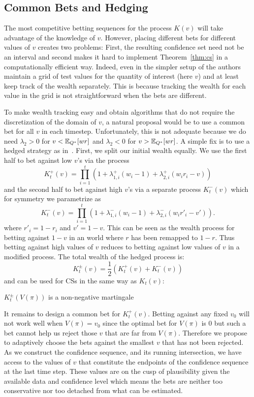 \subsection{Common Bets and Hedging}
\label{sec:hedged}
The most competitive betting sequences for the process $K(v)$ will take
advantage of the knowledge of $v$. However, placing different bets for
different values of $v$ creates two problems: First, the resulting confidence
set need not be an interval and second makes it hard to implement
Theorem~\ref{thm:cs} in a computationally efficient way.  Indeed, even in the
simpler setup of \cite{waudby-smith_variance-adaptive_2020} the authors
maintain a grid of test values for the quantity of interest (here $v$)  and at
least keep track of the wealth separately.  This is because tracking the wealth
for each value in the grid is not straightforward when the bets are different. 

To make wealth tracking easy and obtain algorithms that do not require the
discretization of the domain of $v$, a natural proposal would be to use a
common bet for all $v$ in each timestep. Unfortunately, this is not adequate
because we do need $\lambda_2 > 0$ for $v<\mathbb{E}_{Q^*}[wr]$ and $\lambda_2 < 0$ for
$v>\mathbb{E}_{Q^*}[wr]$.  A simple fix is to use a hedged strategy as
in~\cite{waudby-smith_variance-adaptive_2020}.  First, we split our initial
wealth equally.  We use the first half to bet against low $v$'s via the process
\[
K_t^{+}(v) = \prod_{i=1}^t \left(1+\lambda_{1,i}^{+}(w_i-1)+\lambda_{2,i}^{+}(w_i r_i -v)\right)
\]
and the second half to bet against high $v$'s via a separate process
$K_t^{-}(v)$ which for symmetry we parametrize as
\[
K_t^{-}(v) = \prod_{i=1}^t \left(1+\lambda_{1,i}^{-}(w_i-1)+\lambda_{2,i}^{-}(w_i r'_i -v')\right).
\]
where $r'_i=1-r_i$ and $v'=1-v$.  This can be seen as the wealth process for
betting against $1-v$ in an world where $r$ has been remapped to $1-r$.  Thus
betting against high values of $v$ reduces to betting against low values of $v$
in a modified process. The total wealth of the hedged process is:
\begin{equation}
K_t^{\pm}(v) = \frac{1}{2} (K_t^{+}(v) + K_t^{-}(v))
\label{eq:hedged}
\end{equation}
and can be used for CSs in the same way as $K_t(v)$:
\begin{theorem}
\label{thm:martingale-1d}
$K_t^{\pm}(V(\pi))$ is a non-negative martingale
\end{theorem}

It remains to design a common bet for $K_t^{+}(v)$.  Betting against any fixed
$v_0$ will not work well when $V(\pi)=v_0$ since the optimal bet for $V(\pi)$
is 0 but such a bet cannot help us reject those $v$ that are far from $V(\pi)$.
Therefore we propose to adaptively choose the bets against the smallest $v$
that has not been rejected. As we construct the confidence sequence, and its
running intersection, we have access to the values of $v$ that constitute the
endpoints of the confidence sequence at the last time step. These values are on
the cusp of plausibility given the available data and confidence level which
means the bets are neither too conservative nor too detached from what can be
estimated.

